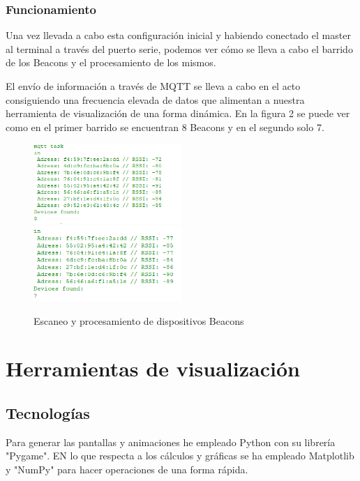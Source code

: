 \documentclass[paper=a4, fontsize=11pt,twoside]{scrartcl}
\begin{document}
        \subsubsection{Funcionamiento}
            Una vez llevada a cabo esta configuración inicial y habiendo conectado el master al terminal a través del puerto serie,
            podemos ver cómo se lleva a cabo el barrido de los Beacons y el procesamiento de los mismos.

            El envío de información a través de MQTT se lleva a cabo en el acto consiguiendo una frecuencia elevada de datos que alimentan a nuestra herramienta 
            de visualización de una forma dinámica. En la figura 2 se puede ver como en el primer barrido se encuentran 8 Beacons y en el segundo solo 7.
            \begin{center}
                \begin{figure}[]
                    \centering
                    \includegraphics[width=0.5\textwidth]{../../Memmory/images/s_scanning_1.PNG}
                    \includegraphics[width=0.5\textwidth]{../../Memmory/images/s_scanning_2.PNG}
                    \caption{Escaneo y procesamiento de dispositivos Beacons}
                    \label{fig:mesh13}
                \end{figure}
            \end{center}
\section{Herramientas de visualización}
    \subsection{Tecnologías}
        Para generar las pantallas y animaciones he empleado Python con su librería "Pygame". EN lo que respecta a los cálculos 
        y gráficas se ha empleado Matplotlib y "NumPy" para hacer operaciones de una forma rápida.  
\end{document}
